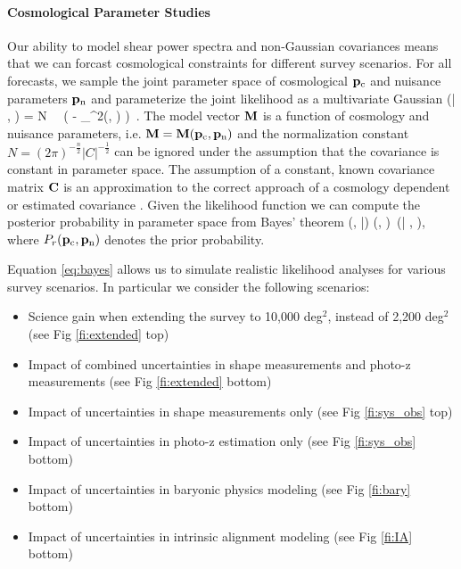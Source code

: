 \paragraph{Cosmological Parameter Studies} Our ability to model shear power spectra and non-Gaussian covariances means that we can forcast cosmological constraints for different survey scenarios. For all forecasts, we sample the joint parameter space of cosmological $\mathbf p_\mathrm{c}$ and nuisance parameters $\mathbf p_\mathrm{n}$ and parameterize the joint likelihood as a multivariate Gaussian
\be
\label{eq:like}
\like (\D| \pco, \pnu) = N \, \times \, \exp \biggl( - _{\chi^2(\pco, \pnu)}  \biggr) \,.
\ee
The model vector $\mathbf M$ is a function of cosmology and nuisance parameters, i.e. $\mathbf M=\mathbf M(\mathbf p_\mathrm{c}, \mathbf p_\mathrm{n})$ and the normalization constant $N=(2 \pi)^{-\frac{n}{2}} |C|^{-\frac{1}{2}}$ can be ignored under the assumption that the covariance is constant in parameter space. The assumption of a constant, known covariance matrix $\mathbf C$ is an approximation to the correct approach of a cosmology dependent or estimated covariance \citep[see][for further details]{esh09, seh16}.
Given the likelihood function we can compute the posterior probability in parameter space from Bayes' theorem
\be
\label{eq:bayes}
\prob(\pco, \pnu|\D) \propto \probr (\pco, \pnu) \,\like (\D| \pco, \pnu),
\ee
where $P_r (\mathbf p_\mathrm{c}, \mathbf p_\mathrm{n})$ denotes the prior probability.

Equation \ref{eq:bayes} allows us to simulate realistic likelihood analyses for various survey scenarios. In particular we consider the following scenarios:
\begin{itemize}
\item Science gain when extending the survey to 10,000 deg$^2$, instead of 2,200 deg$^2$ (see Fig \ref{fi:extended} top)
\item Impact of combined uncertainties in shape measurements and photo-z measurements (see Fig \ref{fi:extended} bottom)
\item Impact of uncertainties in shape measurements only (see Fig \ref{fi:sys_obs} top)
\item Impact of uncertainties in photo-z estimation only (see Fig \ref{fi:sys_obs} bottom)
\item Impact of uncertainties in baryonic physics modeling (see Fig \ref{fi:bary} bottom)
\item Impact of uncertainties in intrinsic alignment modeling (see Fig \ref{fi:IA} bottom)
\end{itemize}

